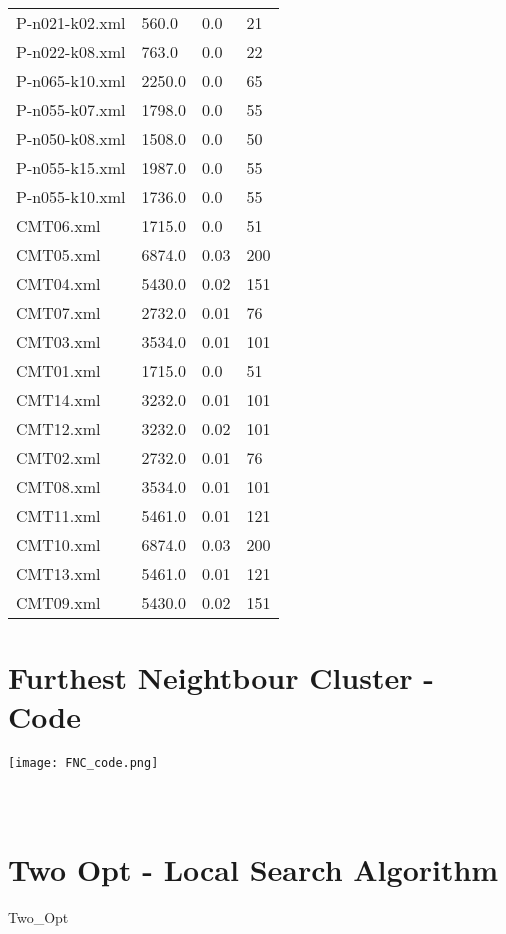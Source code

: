 \documentclass[12pt]{article}
\begin{document}
\begin{appendices}
\begin{table}[]
\begin{tabular}{llll}
	P-n021-k02.xml & 560.0 & 0.0 & 21 \\
	P-n022-k08.xml & 763.0 & 0.0 & 22 \\
	P-n065-k10.xml & 2250.0 & 0.0 & 65 \\
	P-n055-k07.xml & 1798.0 & 0.0 & 55 \\
	P-n050-k08.xml & 1508.0 & 0.0 & 50 \\
	P-n055-k15.xml & 1987.0 & 0.0 & 55 \\
	P-n055-k10.xml & 1736.0 & 0.0 & 55 \\
	CMT06.xml & 1715.0 & 0.0 & 51 \\
	CMT05.xml & 6874.0 & 0.03 & 200 \\
	CMT04.xml & 5430.0 & 0.02 & 151 \\
	CMT07.xml & 2732.0 & 0.01 & 76 \\
	CMT03.xml & 3534.0 & 0.01 & 101 \\
	CMT01.xml & 1715.0 & 0.0 & 51 \\
	CMT14.xml & 3232.0 & 0.01 & 101 \\
	CMT12.xml & 3232.0 & 0.02 & 101 \\
	CMT02.xml & 2732.0 & 0.01 & 76 \\
	CMT08.xml & 3534.0 & 0.01 & 101 \\
	CMT11.xml & 5461.0 & 0.01 & 121 \\
	CMT10.xml & 6874.0 & 0.03 & 200 \\
	CMT13.xml & 5461.0 & 0.01 & 121 \\
	CMT09.xml & 5430.0 & 0.02 & 151
	\end{tabular}
	\end{table}
\newpage


\section{Furthest Neightbour Cluster - Code}

\texttt{[image: FNC\_code.png]}


\section{\\Two Opt - Local Search Algorithm}

\begin{algorithm}[!ht]
	\caption{Two\_Opt}
	\begin{algorithmic}[1]


\end{algorithmic}
\end{algorithm}
\end{appendices}
\end{document}
